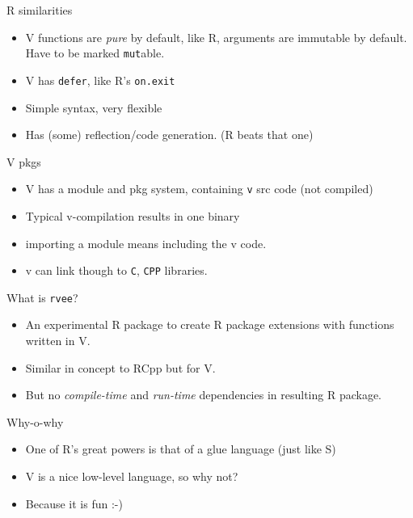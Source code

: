 \documentclass[
  ignorenonframetext,
]{beamer}
\providecommand{\tightlist}{%
  \setlength{\itemsep}{0pt}\setlength{\parskip}{0pt}}
\begin{document}
\begin{frame}[fragile]{R similarities}
\protect\hypertarget{r-similarities}{}
\begin{itemize}
\tightlist
\item
  V functions are \emph{pure} by default, like R, arguments are
  immutable by default. Have to be marked \texttt{mut}able.
\item
  V has \texttt{defer}, like R's \texttt{on.exit}
\item
  Simple syntax, very flexible
\item
  Has (some) reflection/code generation. (R beats that one)
\end{itemize}
\end{frame}

\begin{frame}[fragile]{V pkgs}
\protect\hypertarget{v-pkgs}{}
\begin{itemize}
\tightlist
\item
  V has a module and pkg system, containing \texttt{v} src code (not
  compiled)
\item
  Typical v-compilation results in one binary
\item
  importing a module means including the v code.
\item
  v can link though to \texttt{C}, \texttt{CPP} libraries.
\end{itemize}
\end{frame}

\begin{frame}{What is \texttt{rvee}?}
\protect\hypertarget{what-is-rvee}{}
\begin{itemize}
\tightlist
\item
  An experimental R package to create R package extensions with
  functions written in V.
\item
  Similar in concept to RCpp but for V.
\item
  But no \emph{compile-time} and \emph{run-time} dependencies in
  resulting R package.
\end{itemize}

\begin{block}{Why-o-why}
\protect\hypertarget{why-o-why}{}
\begin{itemize}
\tightlist
\item
  One of R's great powers is that of a glue language (just like S)
\item
  V is a nice low-level language, so why not?
\item
  Because it is fun :-)
\end{itemize}
\end{block}
\end{frame}
\end{document}
